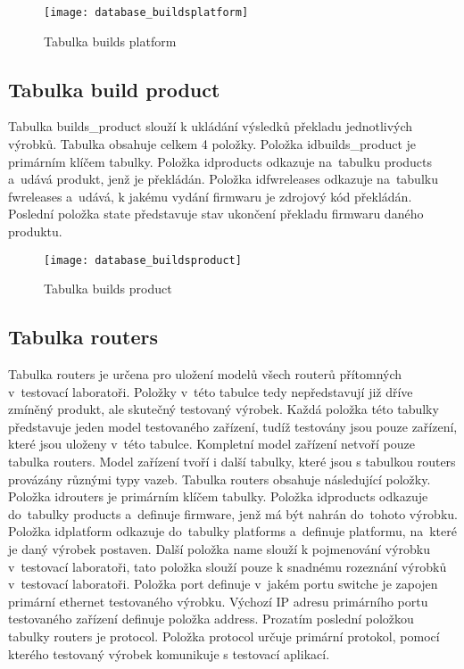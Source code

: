 \begin{figure}[h]
  \centering
  \texttt{[image: database\_buildsplatform]}
  \caption{Tabulka builds platform}
  \label{fig:database_buildsplatform}
\end{figure}

\subsection{Tabulka build product}
Tabulka builds\_product slouží k ukládání výsledků překladu jednotlivých výrobků. Tabulka obsahuje celkem 4 položky. Položka idbuilds\_product je primárním klíčem tabulky. Položka idproducts odkazuje na~tabulku products a~udává produkt, jenž je překládán. Položka idfwreleases odkazuje na~tabulku fwreleases a~udává, k jakému vydání firmwaru je zdrojový kód překládán. Poslední položka state představuje stav ukončení překladu firmwaru daného produktu.

\begin{figure}[h]
  \centering
  \texttt{[image: database\_buildsproduct]}
  \caption{Tabulka builds product}
  \label{fig:database_buildsproduct}
\end{figure}

\subsection{Tabulka routers}
Tabulka routers je určena pro uložení modelů všech routerů přítomných v~testovací laboratoři. Položky v~této tabulce tedy nepředstavují již dříve zmíněný produkt, ale skutečný testovaný výrobek. Každá položka této tabulky představuje jeden model testovaného zařízení, tudíž testovány jsou pouze zařízení, které jsou uloženy v~této tabulce. Kompletní model zařízení netvoří pouze tabulka routers. Model zařízení tvoří i další tabulky, které jsou s tabulkou routers provázány různými typy vazeb. Tabulka routers obsahuje následující položky. Položka idrouters je primárním klíčem tabulky. Položka idproducts odkazuje do~tabulky products a~definuje firmware, jenž má být nahrán do~tohoto výrobku. Položka idplatform odkazuje do~tabulky platforms a~definuje platformu, na~které je daný výrobek postaven. Další položka name slouží k pojmenování výrobku v~testovací laboratoři, tato položka slouží pouze k snadnému rozeznání výrobků v~testovací laboratoři. Položka port definuje v~jakém portu switche je zapojen primární ethernet testovaného výrobku. Výchozí IP adresu primárního portu testovaného zařízení definuje položka address. Prozatím poslední položkou tabulky routers je protocol. Položka protocol určuje primární protokol, pomocí kterého testovaný výrobek komunikuje s testovací aplikací.

